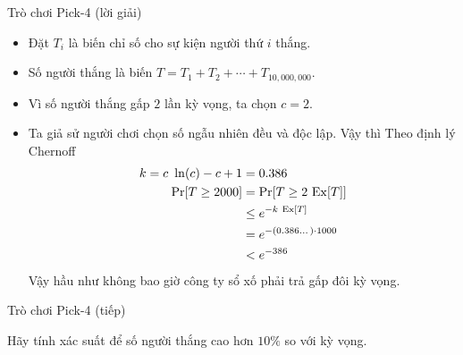 \begin{frame}[t]{Trò chơi Pick-4 (lời giải)}
  \begin{itemize}
    
  \item<+-> Đặt $T_i$ là biến chỉ số cho sự kiện người thứ $i$ thắng.
  \item<+-> Số người thắng là biến $	T = T_1 + T_2 + \cdots + T_{10,000,000}$.

  \item<+-> Vì số người thắng gấp $2$ lần kỳ vọng, ta chọn $c = 2$.
    
  \item<+-> Ta giả sử người chơi chọn số ngẫu nhiên đều và  độc lập. Vậy thì   Theo định lý Chernoff
    \begin{align*}
      k = c\ \ln(c) - c + 1 &= 0.386 \\
      \mathrm{Pr}[T \geq 2000] &= \mathrm{Pr}[T \geq 2\ \mathrm{Ex}[T]] \\
                            &\leq e^{-k\ \mathrm{Ex}[T]} \\
                            &=e^{-(0.386\dots)\cdot 1000}\\
                            &< e^{-386}
    \end{align*}  
    Vậy hầu như không bao giờ công ty sổ xố phải trả gấp đôi kỳ vọng.
  \end{itemize}
\end{frame}

\begin{frame}{Trò chơi Pick-4 (tiếp)}
  \begin{xrcs}
    Hãy tính xác suất để số người thắng  cao hơn $10\%$ so với kỳ vọng.
  \end{xrcs}
          \end{frame}

